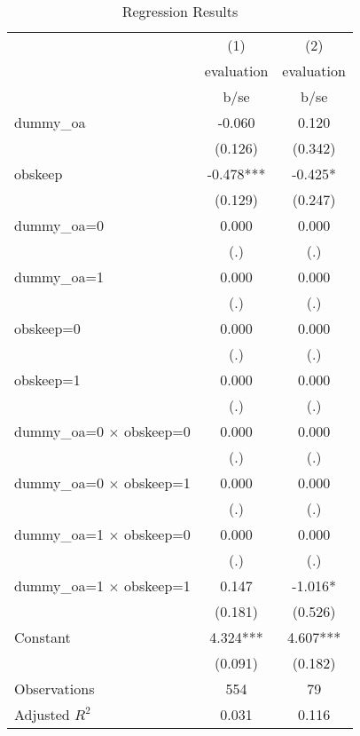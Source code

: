 \begin{table}[htbp]\centering
\def\sym#1{\ifmmode^{#1}\else\(^{#1}\)\fi}
\caption{Regression Results}
\begin{tabular}{l*{2}{c}}
\hline\hline
                    &\multicolumn{1}{c}{(1)}&\multicolumn{1}{c}{(2)}\\
                    &\multicolumn{1}{c}{evaluation}&\multicolumn{1}{c}{evaluation}\\
                    &        b/se   &        b/se   \\
\hline
dummy\_oa            &      -0.060   &       0.120   \\
                    &     (0.126)   &     (0.342)   \\
obskeep             &      -0.478***&      -0.425*  \\
                    &     (0.129)   &     (0.247)   \\
dummy\_oa=0          &       0.000   &       0.000   \\
                    &         (.)   &         (.)   \\
dummy\_oa=1          &       0.000   &       0.000   \\
                    &         (.)   &         (.)   \\
obskeep=0           &       0.000   &       0.000   \\
                    &         (.)   &         (.)   \\
obskeep=1           &       0.000   &       0.000   \\
                    &         (.)   &         (.)   \\
dummy\_oa=0 $\times$ obskeep=0&       0.000   &       0.000   \\
                    &         (.)   &         (.)   \\
dummy\_oa=0 $\times$ obskeep=1&       0.000   &       0.000   \\
                    &         (.)   &         (.)   \\
dummy\_oa=1 $\times$ obskeep=0&       0.000   &       0.000   \\
                    &         (.)   &         (.)   \\
dummy\_oa=1 $\times$ obskeep=1&       0.147   &      -1.016*  \\
                    &     (0.181)   &     (0.526)   \\
Constant            &       4.324***&       4.607***\\
                    &     (0.091)   &     (0.182)   \\
\hline
Observations        &         554   &          79   \\
Adjusted \(R^{2}\)  &       0.031   &       0.116   \\
\hline\hline
\end{tabular}
\end{table}
